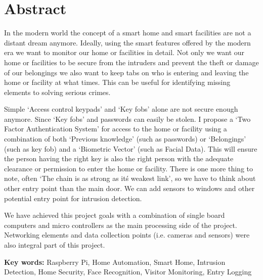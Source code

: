 \chapter*{Abstract}
\begin{flushleft}
    In the modern world the concept of a smart home and smart facilities are not a distant dream anymore.
    Ideally, using the smart features offered by the modern era we want to monitor our home or facilities
    in detail. Not only we want our home or facilities to be secure from the intruders and prevent the theft
    or damage of our belongings we also want to keep tabs on who is entering and leaving the home or facility
    at what times. This can be useful for identifying missing elements to solving serious crimes.
    \vspace{.5cm}

    Simple `Access control keypads' and `Key fobs' alone are not secure enough anymore. Since `Key fobs' and 
    passwords can easily be stolen. I propose a `Two Factor Authentication System' for access to the home or
    facility using a combination of both `Previous knowledge' (such as passwords) or `Belongings' (such as key fob)
    and a `Biometric Vector' (such as Facial Data). This will ensure the person having the right key is also the right 
    person with the adequate clearance or permission to enter the home or facility. There is one more thing to note, 
    often `The chain is as strong as it\'s weakest link', so we have to think about other entry point than the main
    door. We can add sensors to windows and other potential entry point for intrusion detection. 
    \vspace{.5cm}

    We have achieved this project goals with a combination of single board computers and micro controllers as 
    the main processing side of the project. Networking elements and data collection points (i.e. cameras and sensors) 
    were also integral part of this project. 
    \vspace{.5cm}

    \textbf{Key words: }Raspberry Pi, Home Automation, Smart Home, Intrusion Detection, Home Security, Face Recognition,
    Visitor Monitoring, Entry Logging


\end{flushleft}
